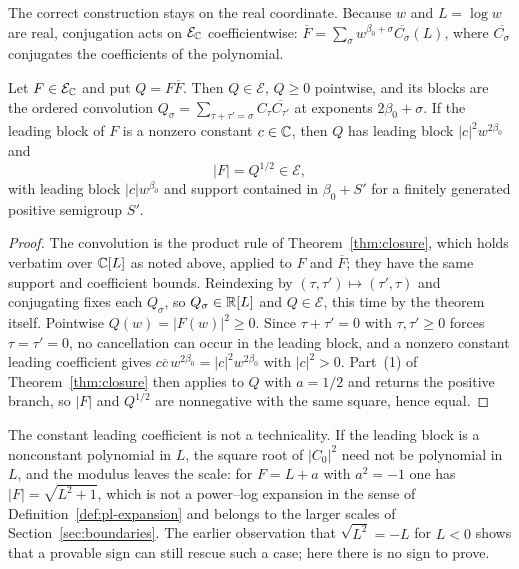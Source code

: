 The correct construction stays on the real coordinate. Because $w$ and
$L=\log w$ are real, conjugation acts on $\mathcal E_\mathbb C$ coefficientwise:
$\overline F=\sum_\sigma w^{\beta_0+\sigma}\overline{C_\sigma}(L)$, where
$\overline{C_\sigma}$ conjugates the coefficients of the polynomial.

\begin{proposition}
\label{prop:modulus}
Let $F\in\mathcal E_\mathbb C$ and put $Q=F\overline F$. Then $Q\in\mathcal E$, $Q\ge0$
pointwise, and its blocks are the ordered convolution
$Q_\sigma=\sum_{\tau+\tau'=\sigma}C_\tau\overline{C_{\tau'}}$ at exponents
$2\beta_0+\sigma$. If the leading block of $F$ is a nonzero constant $c\in\mathbb C$,
then $Q$ has leading block $|c|^2w^{2\beta_0}$ and
\[
 |F|=Q^{1/2}\in\mathcal E,
\]
with leading block $|c|w^{\beta_0}$ and support contained in $\beta_0+S'$ for a
finitely generated positive semigroup $S'$.
\end{proposition}
\begin{proof}
The convolution is the product rule of Theorem~\ref{thm:closure}, which holds
verbatim over $\mathbb C[L]$ as noted above, applied to $F$ and $\overline F$; they
have the same support and coefficient bounds. Reindexing by
$(\tau,\tau')\mapsto(\tau',\tau)$ and conjugating fixes each $Q_\sigma$, so
$Q_\sigma\in\mathbb R[L]$ and $Q\in\mathcal E$, this time by the theorem itself.
Pointwise $Q(w)=|F(w)|^2\ge0$. Since $\tau+\tau'=0$ with $\tau,\tau'\ge0$
forces $\tau=\tau'=0$, no cancellation can occur in the leading block, and a
nonzero constant leading coefficient gives $c\overline c\,w^{2\beta_0}=|c|^2w^{2\beta_0}$
with $|c|^2>0$. Part~(1) of Theorem~\ref{thm:closure} then applies to $Q$ with
$a=1/2$ and returns the positive branch, so $|F|$ and $Q^{1/2}$ are nonnegative
with the same square, hence equal.
\end{proof}

The constant leading coefficient is not a technicality. If the leading block is
a nonconstant polynomial in $L$, the square root of $|C_{0}|^2$ need not be
polynomial in $L$, and the modulus leaves the scale: for $F=L+a$ with $a^2=-1$
one has $|F|=\sqrt{L^2+1}$, which is not a power--log expansion in the sense of
Definition~\ref{def:pl-expansion} and belongs to the larger scales of
Section~\ref{sec:boundaries}. The earlier observation that $\sqrt{L^2}=-L$ for
$L<0$ shows that a provable sign can still rescue such a case; here there is no
sign to prove.


